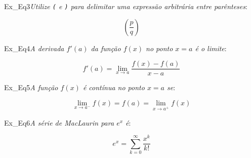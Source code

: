 \begin{texercise}{Ex_Eq3}\textit{Utilize \texttt{(} e \texttt{)} para delimitar uma expressão arbitrária entre parênteses}:\par\smallskip%
\begin{tcboutputlisting}
    \begin{center}
        \begin{equation*}
            \left( \frac{p}{q} \right)
        \end{equation*}
    \end{center}
\end{tcboutputlisting}
\tcbuselistingtext%
\end{texercise}

\begin{texercise}{Ex_Eq4}\textit{A derivada \(f'(a)\) da função \(f(x)\) no ponto \(x=a\) é o limite}:\par\smallskip%
\begin{tcboutputlisting}
    \begin{center}
        \begin{equation*}
            f'(a) = \lim_{x \to a} \frac{f(x) - f(a)}{x - a}
        \end{equation*}
    \end{center}
\end{tcboutputlisting}
\tcbuselistingtext%
\end{texercise}

\begin{texercise}{Ex_Eq5}\textit{A função \(f(x)\) é contínua no ponto \(x=a\) se}:\par\smallskip%
\begin{tcboutputlisting}
    \begin{center}
        \begin{equation*}
            \lim_{x \to a^-} f(x) = f(a) = \lim_{x \to a^+} f(x)
        \end{equation*}
    \end{center}
\end{tcboutputlisting}
\tcbuselistingtext%
\end{texercise}

\begin{texercise}{Ex_Eq6}\textit{A série de MacLaurin para \(e^x\) é}:\par\smallskip%
\begin{tcboutputlisting}
    \begin{center}
        \begin{equation*}
            e^x = \sum_{k=0}^{\infty} \frac{x^k}{k!}
        \end{equation*}
    \end{center}
\end{tcboutputlisting}
\tcbuselistingtext%
\end{texercise}

